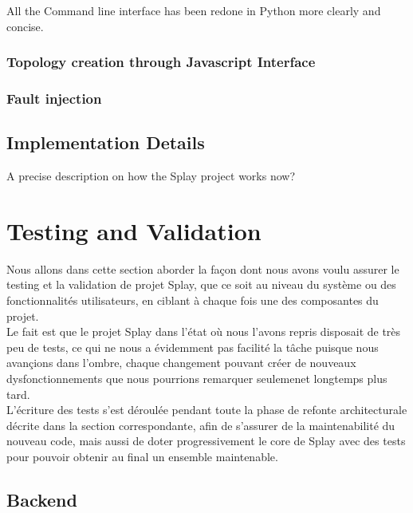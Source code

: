 \documentclass{eplmastersthesis}
\begin{document}
        All the Command line interface has been redone in Python more clearly and concise.

      \subsection{Topology creation through Javascript Interface}

      \subsection{Fault injection}

    \section{Implementation Details}

      A precise description on how the Splay project works now?


  \chapter{Testing and Validation}

    Nous allons dans cette section aborder la façon dont nous avons voulu assurer
    le testing et la validation de projet Splay, que ce soit au niveau du système
    ou des fonctionnalités utilisateurs, en ciblant à chaque fois une des
    composantes du projet.\\

    Le fait est que le projet Splay dans l'état où nous l'avons repris disposait
    de très peu de tests, ce qui ne nous a évidemment pas facilité la tâche puisque
    nous avançions dans l'ombre, chaque changement pouvant créer de nouveaux
    dysfonctionnements que nous pourrions remarquer seulemenet longtemps plus tard.\\

    L'écriture des tests s'est déroulée pendant toute la phase de refonte
    architecturale décrite dans la section correspondante, afin de s'assurer
    de la maintenabilité du nouveau code, mais aussi de doter progressivement
    le core de Splay avec des tests pour pouvoir obtenir au final un ensemble
    maintenable.\\

    \section{Backend}
\end{document}
